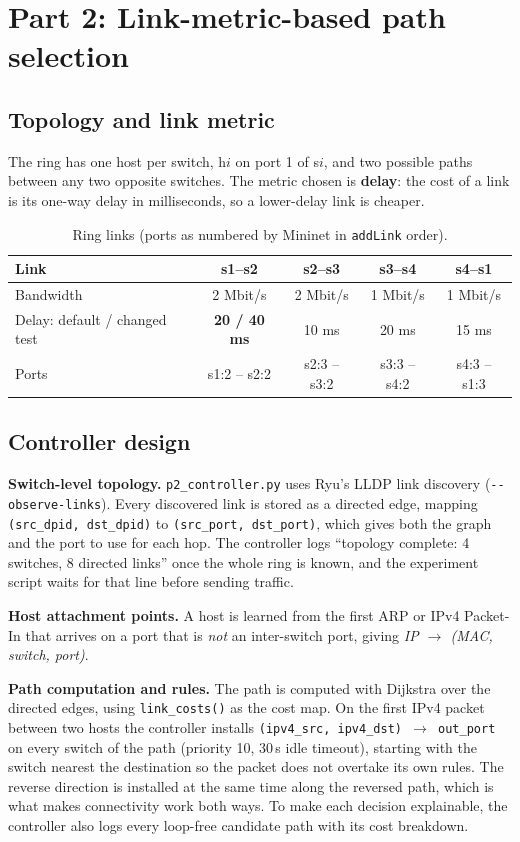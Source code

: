 \documentclass[11pt]{article}
\begin{document}
\section{Part 2: Link-metric-based path selection}

\subsection{Topology and link metric}
The ring has one host per switch, h$i$ on port 1 of s$i$, and two possible paths between any two
opposite switches. The metric chosen is \textbf{delay}: the cost of a link is its one-way delay in
milliseconds, so a lower-delay link is cheaper.

\begin{table}[H]
\centering
\caption{Ring links (ports as numbered by Mininet in \texttt{addLink} order).}
\begin{tabular}{lcccc}
\toprule
Link & s1--s2 & s2--s3 & s3--s4 & s4--s1 \\
\midrule
Bandwidth & 2 Mbit/s & 2 Mbit/s & 1 Mbit/s & 1 Mbit/s \\
Delay: default / changed test & \textbf{20 / 40 ms} & 10 ms & 20 ms & 15 ms \\
Ports & s1:2 -- s2:2 & s2:3 -- s3:2 & s3:3 -- s4:2 & s4:3 -- s1:3 \\
\bottomrule
\end{tabular}
\end{table}

\subsection{Controller design}
\textbf{Switch-level topology.} \texttt{p2\_controller.py} uses Ryu's LLDP link discovery
(\texttt{-{}-observe-links}). Every discovered link is stored as a directed edge, mapping
\texttt{(src\_dpid, dst\_dpid)} to \texttt{(src\_port, dst\_port)}, which gives both the graph and
the port to use for each hop. The controller logs ``topology complete: 4 switches, 8 directed links'' once the
whole ring is known, and the experiment script waits for that line before sending traffic.

\textbf{Host attachment points.} A host is learned from the first ARP or IPv4 Packet-In that arrives
on a port that is \emph{not} an inter-switch port, giving \emph{IP $\to$ (MAC, switch, port)}.

\textbf{Path computation and rules.} The path is computed with Dijkstra over the directed edges, using
\texttt{link\_costs()} as the cost map. On the first IPv4 packet between two hosts the controller
installs \texttt{(ipv4\_src, ipv4\_dst) $\to$ out\_port} on every switch of the path (priority 10,
30\,s idle timeout), starting with the switch nearest the destination so the packet does not overtake
its own rules. The reverse direction is installed at the same time along the reversed path, which is
what makes connectivity work both ways. To make each decision explainable, the controller also logs
every loop-free candidate path with its cost breakdown.
\end{document}
